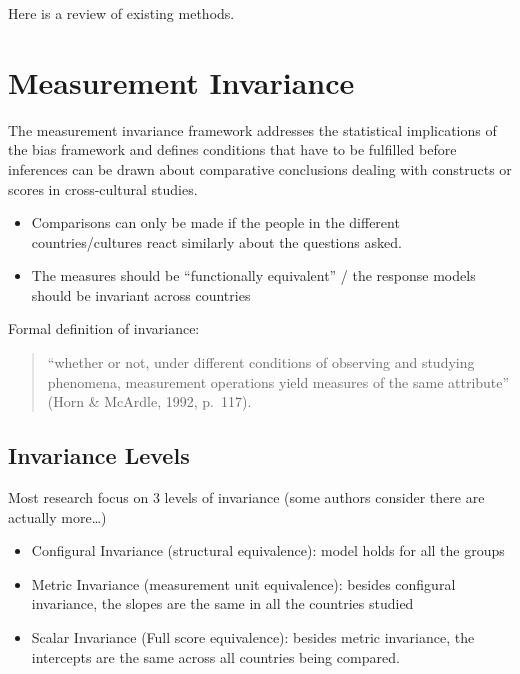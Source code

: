 \documentclass[
]{book}
\begin{document}
Here is a review of existing methods.

\hypertarget{measurement-invariance}{%
\chapter{Measurement Invariance}\label{measurement-invariance}}

The measurement invariance framework addresses the statistical implications of the bias framework and defines conditions that have to be fulfilled before inferences can be drawn about comparative conclusions dealing with constructs or scores in cross-cultural studies.

\begin{itemize}
\item
  Comparisons can only be made if the people in the different countries/cultures react similarly about the questions asked.
\item
  The measures should be ``functionally equivalent'' / the response models should be invariant across countries
\end{itemize}

Formal definition of invariance:

\begin{quote}
``whether or not, under different conditions of observing and studying phenomena, measurement operations yield measures of the same attribute'' (Horn \& McArdle, 1992, p.~117).
\end{quote}

\hypertarget{invariance-levels}{%
\section{Invariance Levels}\label{invariance-levels}}

Most research focus on 3 levels of invariance (some authors consider there are actually more\ldots)

\begin{itemize}
\item
  Configural Invariance (structural equivalence): model holds for all the groups
\item
  Metric Invariance (measurement unit equivalence): besides configural invariance, the slopes are the same in all the countries studied
\item
  Scalar Invariance (Full score equivalence): besides metric invariance, the intercepts are the same across all countries being compared.
\end{itemize}
\end{document}
